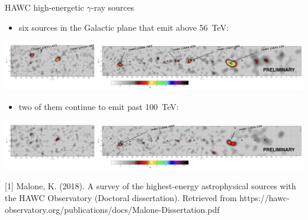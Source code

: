 \begin{frame}{HAWC high-energetic $\gamma$-ray sources}

\begin{itemize}
  \item six sources in the Galactic plane that emit above 56~TeV:
\end{itemize}
\includegraphics[width=1\textwidth]{pics/HWC_above_56TeV.png}
\begin{itemize}
  \item two of them continue to emit past 100~TeV:
\end{itemize}
\includegraphics[width=1\textwidth]{pics/HWC_above_100TeV.png}

\small
[1] Malone, K. (2018). A survey of the highest-energy astrophysical sources with the HAWC Observatory (Doctoral dissertation).
Retrieved from https://hawc-observatory.org/publications/docs/Malone-Dissertation.pdf

\end{frame}
